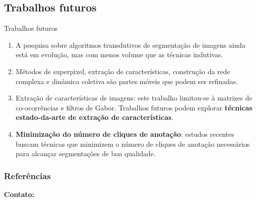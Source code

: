 \documentclass{templatebeamerufc/libs/ufc_format}
\begin{document}
\subsection{Trabalhos futuros}
\begin{frame}{Trabalhos futuros}
  \begin{enumerate}[<+->]
  \item A pesquisa sobre algoritmos transdutivos de segmentação de
imagens ainda está em evolução, mas com menos volume que as técnicas
indutivas.

  \item Métodos de superpixel, extração de características, construção
da rede complexa e dinâmica coletiva são partes móveis que podem ser
refinadas.

  \item Extração de características de imagens: este trabalho
limitou-se à matrizes de co-ocorrências e filtros de Gabor. Trabalhos
futuros podem explorar \textbf{técnicas estado-da-arte de extração de
características}.

\item \textbf{Minimização do número de cliques de anotação}: estudos recentes \cite{chen2022focalclick}
  buscam técnicas que minimizem o número de cliques de anotação
  necessários para alcançar segmentações de boa qualidade.


  \end{enumerate}
\end{frame}


\begin{frame}[allowframebreaks]
  \frametitle{Referências}
  
\end{frame}

\begin{frame}{}
    \centering
    \huge{\textbf{}}

    \vspace{1cm}

    \Large{\textbf{Contato:}}
    \newline
    \vspace*{0.5cm}
    \large{}
\end{frame}
\end{document}
